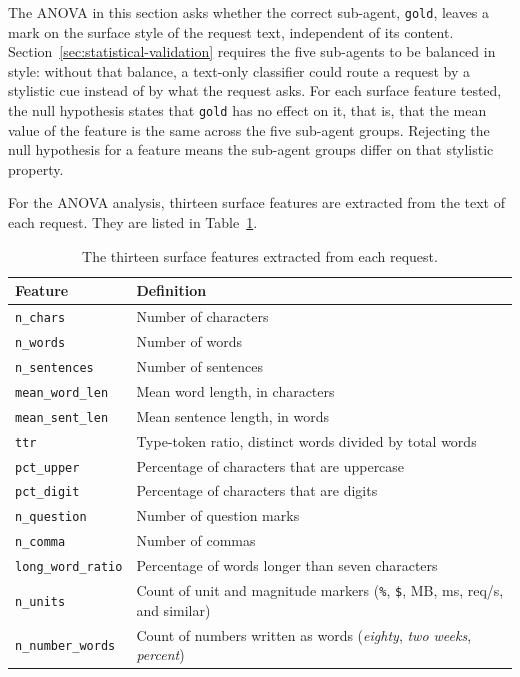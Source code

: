 The ANOVA in this section asks whether the correct sub-agent, \texttt{gold}, leaves a mark on the surface style of the request text, independent of its content. Section~\ref{sec:statistical-validation} requires the five sub-agents to be balanced in style: without that balance, a text-only classifier could route a request by a stylistic cue instead of by what the request asks. For each surface feature tested, the null hypothesis states that \texttt{gold} has no effect on it, that is, that the mean value of the feature is the same across the five sub-agent groups. Rejecting the null hypothesis for a feature means the sub-agent groups differ on that stylistic property.

For the ANOVA analysis, thirteen surface features are extracted from the text of each request. They are listed in Table~\ref{tab:surface-features}.

\begin{table}[H]
    \centering
    \begin{tabularx}{\textwidth}{@{}l>{\raggedright\arraybackslash}X@{}}
        \toprule
        \textbf{Feature} & \textbf{Definition} \\
        \midrule
        \texttt{n\_chars} & Number of characters \\
        \texttt{n\_words} & Number of words \\
        \texttt{n\_sentences} & Number of sentences \\
        \texttt{mean\_word\_len} & Mean word length, in characters \\
        \texttt{mean\_sent\_len} & Mean sentence length, in words \\
        \texttt{ttr} & Type-token ratio, distinct words divided by total words \\
        \texttt{pct\_upper} & Percentage of characters that are uppercase \\
        \texttt{pct\_digit} & Percentage of characters that are digits \\
        \texttt{n\_question} & Number of question marks \\
        \texttt{n\_comma} & Number of commas \\
        \texttt{long\_word\_ratio} & Percentage of words longer than seven characters \\
        \texttt{n\_units} & Count of unit and magnitude markers (\texttt{\%}, \texttt{\$}, MB, ms, req/s, and similar) \\
        \texttt{n\_number\_words} & Count of numbers written as words (\textit{eighty}, \textit{two weeks}, \textit{percent}) \\
        \bottomrule
    \end{tabularx}
    \caption[The thirteen surface features extracted from each request]{The thirteen surface features extracted from each request.}
    \label{tab:surface-features}
\end{table}

